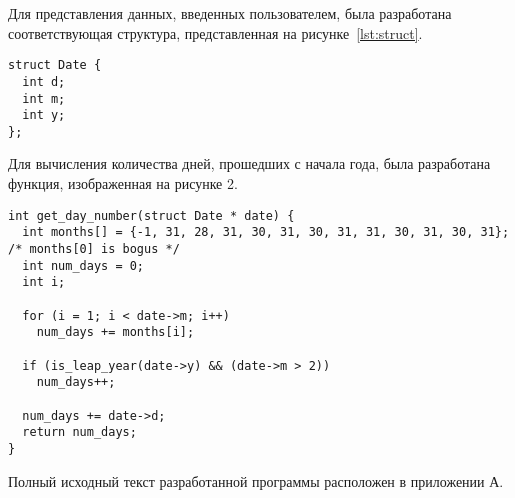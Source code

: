 Для представления данных, введенных пользователем, была разработана 
соответствующая структура, представленная на рисунке~\ref{lst:struct}.

\begin{lstlisting}[caption=Структура Date,label=lst:struct]
struct Date {
  int d;
  int m;
  int y;
};
\end{lstlisting}

Для вычисления количества дней,
прошедших с начала года, была разработана функция, изображенная на рисунке 2. 

\begin{lstlisting}[caption={Функция вычисления результата}]
int get_day_number(struct Date * date) {
  int months[] = {-1, 31, 28, 31, 30, 31, 30, 31, 31, 30, 31, 30, 31}; /* months[0] is bogus */
  int num_days = 0;
  int i;

  for (i = 1; i < date->m; i++)
    num_days += months[i];

  if (is_leap_year(date->y) && (date->m > 2))
    num_days++;

  num_days += date->d;
  return num_days;
}
\end{lstlisting}

Полный исходный текст разработанной программы расположен в приложении А.
